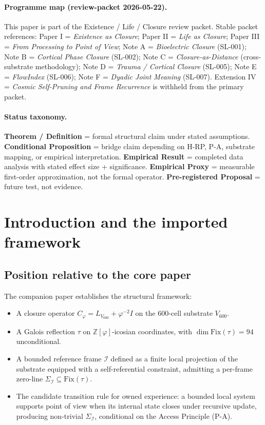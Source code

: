 \documentclass[11pt]{article}
\theoremstyle{plain}
\theoremstyle{definition}
\theoremstyle{remark}
\newcommand{\Zphi}{\mathbb{Z}[\varphi]}
\newcommand{\Fix}{\mathrm{Fix}}
\newcommand{\Ical}{\mathcal{I}}
\newcommand{\Cph}{C_\varphi}
\begin{document}
\paragraph{Programme map (review-packet 2026-05-22).}
This paper is part of the Existence / Life / Closure review packet. Stable packet references:
Paper I = \emph{Existence as Closure};
Paper II = \emph{Life as Closure};
Paper III = \emph{From Processing to Point of View};
Note A = \emph{Bioelectric Closure} (SL-001);
Note B = \emph{Cortical Phase Closure} (SL-002);
Note C = \emph{Closure-as-Distance} (cross-substrate methodology);
Note D = \emph{Trauma / Cortical Closure} (SL-005);
Note E = \emph{FlowIndex} (SL-006);
Note F = \emph{Dyadic Joint Meaning} (SL-007).
Extension IV = \emph{Cosmic Self-Pruning and Frame Recurrence} is withheld from the primary packet.

\paragraph{Status taxonomy.}
\textbf{Theorem / Definition} = formal structural claim under stated assumptions.
\textbf{Conditional Proposition} = bridge claim depending on H-RP, P-A, substrate mapping, or empirical interpretation.
\textbf{Empirical Result} = completed data analysis with stated effect size + significance.
\textbf{Empirical Proxy} = measurable first-order approximation, not the formal operator.
\textbf{Pre-registered Proposal} = future test, not evidence.



\section{Introduction and the imported framework}\label{sec:intro}

\subsection{Position relative to the core paper}

The companion paper \citet{SmartExistenceClosure} establishes the structural framework:

\begin{itemize}[leftmargin=2em]
\item A closure operator $\Cph = L_{V_{600}} + \varphi^{-2} I$ on the 600-cell substrate $V_{600}$.
\item A Galois reflection $\tau$ on $\Zphi$-icosian coordinates, with $\dim \Fix(\tau) = 94$ unconditional.
\item A bounded reference frame $\Ical$ defined as a finite local projection of the substrate equipped with a self-referential constraint, admitting a per-frame zero-line $\Sigma_\Ical \subseteq \Fix(\tau)$.
\item The candidate transition rule for owned experience: a bounded local system supports point of view when its internal state closes under recursive update, producing non-trivial $\Sigma_\Ical$, conditional on the Access Principle (P-A).
\end{itemize}
\end{document}
